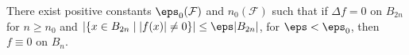 \begin{theorem}\label{theorem:zero-case}
	There exist positive constants $\eps_0(\mathcal{F})$ and $n_0(\mathcal{F})$ such that if $\Delta f = 0$ on $B_{2 n}$ for $n \geq n_0$
	and $|\{x \in B_{2n} \mid |f(x)| \neq 0\}| \leq \eps |B_{2n}|$, for $\eps < \eps_0$, then $f \equiv 0$ on $B_n$.
\end{theorem}
